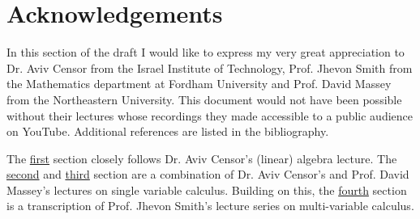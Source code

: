 \section{Acknowledgements}

\begin{flushleft}
	In this section of the draft I would like to express my very great appreciation
	to Dr. Aviv Censor from the Israel Institute of Technology, Prof. Jhevon Smith
	from the Mathematics department at Fordham University and Prof. David Massey
	from the Northeastern University. This document would not have been possible
	without their lectures whose recordings they made accessible to a public audience
	on YouTube. Additional references are listed in the bibliography.
\end{flushleft}

\begin{flushleft}
	The \hyperref[sec-lina]{first} section closely follows Dr. Aviv Censor's
	(linear) algebra lecture\cite{algebraCensor2015}. The \hyperref[sec-analysis]{second}
	and \hyperref[sec-single-var-calc]{third} section are a combination of Dr. Aviv
	Censor's \cite{calc1Censor2015} and Prof. David Massey's lectures on single
	variable calculus. Building on this, the \hyperref[sec-multi-var-calc]{fourth}
	section is a transcription of Prof. Jhevon Smith's \cite{vectorCalcSmith2018}
	lecture series on multi-variable calculus.
\end{flushleft}
